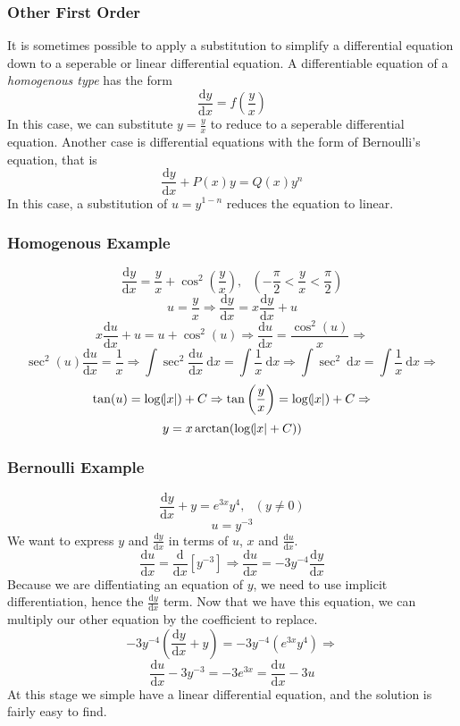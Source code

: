 \documentclass[12pt]{report}
\newcommand{\dx}{\:\mathrm{d}x}
\newcommand{\dd}[2]{\frac{\mathrm{d}#1}{\mathrm{d}#2}}
\newcommand{\mcom}{, \:\:\:}
\newcommand{\derivx}[1]{\frac{\mathrm{d}}{\mathrm{d}x}\left[#1\right]}
\begin{document}
\begin{flushleft}
\subsubsection*{Other First Order}

It is sometimes possible to apply a substitution to simplify a differential
equation down to a seperable or linear differential equation. A differentiable
equation of a \textit{homogenous type} has the form
\[\dd{y}{x} = f\left(\frac{y}{x}\right)\]
In this case, we can substitute \(y = \frac{y}{x}\) to reduce to a seperable
differential equation. Another case is differential equations with the form
of Bernoulli's equation, that is
\[\dd{y}{x} + P(x)y = Q(x)y^n\]
In this case, a substitution of \(u = y^{1 - n}\) reduces the equation to 
linear.

\subsubsection*{Homogenous Example}

\[\dd{y}{x} = \frac{y}{x} + \cos^2\left(\frac{y}{x}\right)
\mcom (-\frac{\pi}{2} < \frac{y}{x} < \frac{\pi}{2})\]
\[u = \frac{y}{x} \Rightarrow \dd{y}{x} = x\dd{y}{x} + u\]
\[x\dd{u}{x} + u = u + \cos^2(u) \Rightarrow \dd{u}{x} = \frac{\cos^2(u)}{x}
\Rightarrow\]
\[\sec^2(u)\dd{u}{x} = \frac{1}{x} \Rightarrow \int\sec^2\dd{u}{x}\dx 
= \int\frac{1}{x}\dx \Rightarrow \int\sec^2\dx = \int\frac{1}{x}\dx
\Rightarrow\]
\[\tan(u) = \log(\abs{x}) + C \Rightarrow \tan\left(\frac{y}{x}\right) 
= \log(\abs{x}) + C \Rightarrow\]
\[y = x\arctan(\log(\abs{x} + C))\]

\subsubsection*{Bernoulli Example}

\begin{center}
    \[\dd{y}{x} + y = e^{3x}y^4\mcom (y\neq0)\]
    \[u = y^{-3}\]
    We want to express \(y\) and \(\dd{y}{x}\) in terms of \(u\), \(x\) and 
    \(\dd{u}{x}\).
    \[\dd{u}{x} = \derivx{y^{-3}} \Rightarrow \dd{u}{x} = -3y^{-4}\dd{y}{x}\]
    Because we are diffentiating an equation of \(y\), we need to use implicit
    differentiation, hence the \(\dd{y}{x}\) term. Now that we have this
    equation, we can multiply our other equation by the coefficient to replace.
    \[-3y^{-4}\left(\dd{y}{x} + y\right) = -3y^{-4}\left(e^{3x}y^4\right)
    \Rightarrow\]
    \[\dd{u}{x} - 3y^{-3} = -3e^{3x} = \dd{u}{x} -3u\]
    At this stage we simple have a linear differential equation, and the
    solution is fairly easy to find.
\end{center}


\end{flushleft}
\end{document}
